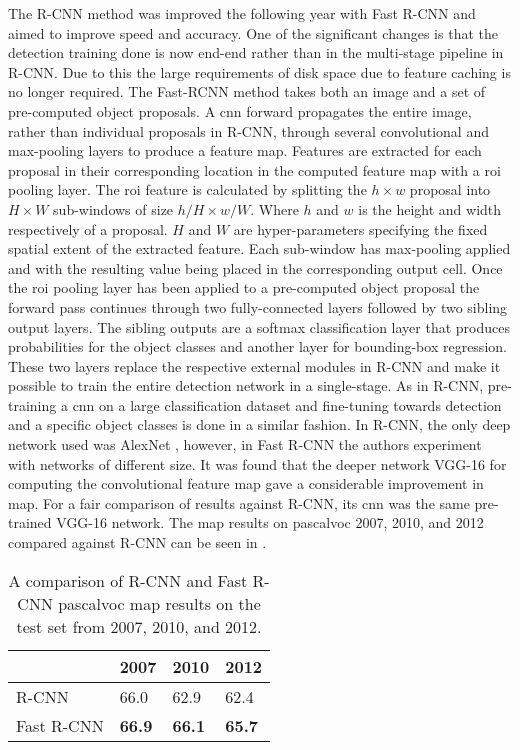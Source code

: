 The R-CNN method was improved the following year with Fast R-CNN \cite{fastrcnn} and aimed to improve speed and accuracy. One of the significant changes is that the detection training done is now end-end rather than in the multi-stage pipeline in R-CNN. Due to this the large requirements of disk space due to feature caching is no longer required. The Fast-RCNN method takes both an image and a set of pre-computed object proposals. A \gls{cnn} forward propagates the entire image, rather than individual proposals in R-CNN, through several convolutional and max-pooling layers to produce a feature map. Features are extracted for each proposal in their corresponding location in the computed feature map with a \gls{roi} pooling layer. The \gls{roi} feature is calculated by splitting the $h \times w$ proposal into $H \times W$ sub-windows of size $h/H \times w/W$. Where $h$ and $w$ is the height and width respectively of a proposal. $H$ and $W$ are hyper-parameters specifying the fixed spatial extent of the extracted feature. Each sub-window has max-pooling applied and with the resulting value being placed in the corresponding output cell. Once the \gls{roi} pooling layer has been applied to a pre-computed object proposal the forward pass continues through two fully-connected layers followed by two sibling output layers. The sibling outputs are a softmax classification layer that produces probabilities for the object classes and another layer for bounding-box regression. These two layers replace the respective external modules in R-CNN and make it possible to train the entire detection network in a single-stage. As in R-CNN, pre-training a \gls{cnn} on a large classification dataset and fine-tuning towards detection and a specific object classes is done in a similar fashion. In R-CNN, the only deep network used was AlexNet \cite{alexnet}, however, in Fast R-CNN the authors experiment with networks of different size. It was found that the deeper network VGG-16 \cite{vgg16} for computing the convolutional feature map gave a considerable improvement in \gls{map}. For a fair comparison of results against R-CNN, its \gls{cnn} was the same pre-trained VGG-16 network. The \gls{map} results on \gls{pascalvoc} 2007, 2010, and 2012 compared against R-CNN can be seen in . 

\begin{table}[]
\centering
\caption{A comparison of R-CNN and Fast R-CNN \gls{pascalvoc} \gls{map} results on the test set from 2007, 2010, and 2012.}
\label{tab:fastresults}
\begin{tabular}{|l|l|l|l|}
 \hline
           & 2007 & 2010 & 2012 \\ \hline
R-CNN      & 66.0 & 62.9 & 62.4 \\ 
Fast R-CNN & \textbf{66.9} & \textbf{66.1} & \textbf{65.7} \\ \hline
\end{tabular}
\end{table}

